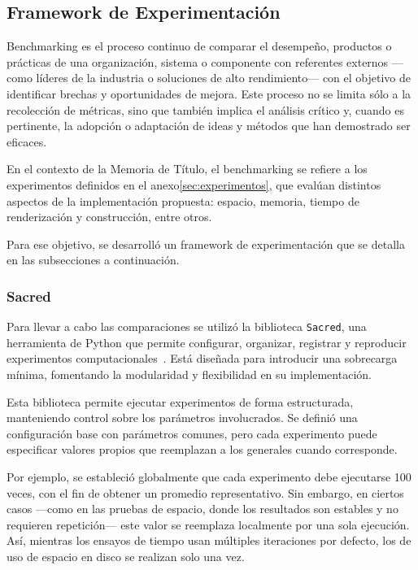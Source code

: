 \subsection{Framework de Experimentación}
\label{benchmarking}
Benchmarking es el proceso continuo de comparar el desempeño, productos o prácticas de una organización, sistema o componente con referentes externos —como líderes de la industria o soluciones de alto rendimiento— con el objetivo de identificar brechas y oportunidades de mejora. Este proceso no se limita sólo a la recolección de métricas, sino que también implica el análisis crítico y, cuando es pertinente, la adopción o adaptación de ideas y métodos que han demostrado ser eficaces.~\cite{stapenhurst2009benchmarking}

En el contexto de la Memoria de Título, el benchmarking se refiere a los experimentos definidos en el anexo\ref{sec:experimentos}, que evalúan distintos aspectos de la implementación propuesta: espacio, memoria, tiempo de renderización y construcción, entre otros.

Para ese objetivo, se desarrolló un framework de experimentación que se detalla en las subsecciones a continuación.

\subsubsection{Sacred}

Para llevar a cabo las comparaciones se utilizó la biblioteca \texttt{Sacred}, una herramienta de Python que permite configurar, organizar, registrar y reproducir experimentos computacionales~\cite{greff2017sacred}. Está diseñada para introducir una sobrecarga mínima, fomentando la modularidad y flexibilidad en su implementación.

Esta biblioteca permite ejecutar experimentos de forma estructurada, manteniendo control sobre los parámetros involucrados. Se definió una configuración base con parámetros comunes, pero cada experimento puede especificar valores propios que reemplazan a los generales cuando corresponde.

Por ejemplo, se estableció globalmente que cada experimento debe ejecutarse 100 veces, con el fin de obtener un promedio representativo. Sin embargo, en ciertos casos —como en las pruebas de espacio, donde los resultados son estables y no requieren repetición— este valor se reemplaza localmente por una sola ejecución. Así, mientras los ensayos de tiempo usan múltiples iteraciones por defecto, los de uso de espacio en disco se realizan solo una vez.

